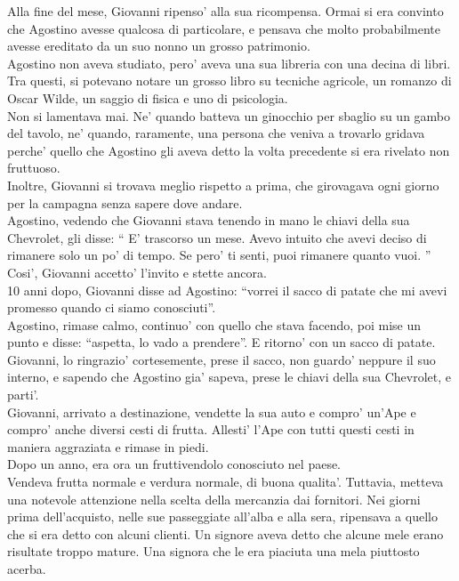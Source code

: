Alla fine del mese, Giovanni ripenso' alla sua ricompensa. Ormai si era convinto che Agostino avesse qualcosa di particolare, e pensava che molto probabilmente avesse ereditato da un suo nonno un grosso patrimonio.\\
Agostino non aveva studiato, pero' aveva una sua libreria con una decina di libri. Tra questi, si potevano notare un grosso libro su tecniche agricole, un romanzo di Oscar Wilde, un saggio di fisica e uno di psicologia.\\
Non si lamentava mai. Ne' quando batteva un ginocchio per sbaglio su un gambo del tavolo, ne' quando, raramente, una persona che veniva a trovarlo gridava perche' quello che Agostino gli aveva detto la volta precedente si era rivelato non fruttuoso.\\
Inoltre, Giovanni si trovava meglio rispetto a prima, che girovagava ogni giorno per la campagna senza sapere dove andare.\\
Agostino, vedendo che Giovanni stava tenendo in mano le chiavi della sua Chevrolet, gli disse: \enquote{
E' trascorso un mese. Avevo intuito che avevi deciso di rimanere solo un po' di tempo. Se pero' ti senti, puoi rimanere quanto vuoi.
}
Cosi', Giovanni accetto' l'invito e stette ancora.\\

10 anni dopo, Giovanni disse ad Agostino: \enquote{vorrei il sacco di patate che mi avevi promesso quando ci siamo conosciuti}.\\
Agostino, rimase calmo, continuo' con quello che stava facendo, poi mise un punto e disse: \enquote{aspetta, lo vado a prendere}. E ritorno' con un sacco di patate.\\
Giovanni, lo ringrazio' cortesemente, prese il sacco, non guardo' neppure il suo interno, e sapendo che Agostino gia' sapeva, prese le chiavi della sua Chevrolet, e parti'.\\

Giovanni, arrivato a destinazione, vendette la sua auto e compro' un'Ape e compro' anche diversi cesti di frutta. Allesti' l'Ape con tutti questi cesti in maniera aggraziata e rimase in piedi.\\

Dopo un anno, era ora un fruttivendolo conosciuto nel paese.\\
Vendeva frutta normale e verdura normale, di buona qualita'. Tuttavia, metteva una notevole attenzione nella scelta della mercanzia dai fornitori. Nei giorni prima dell'acquisto, nelle sue passeggiate all'alba e alla sera, ripensava a quello che si era detto con alcuni clienti. Un signore aveva detto che alcune mele erano risultate troppo mature. Una signora che le era piaciuta una mela piuttosto acerba.

